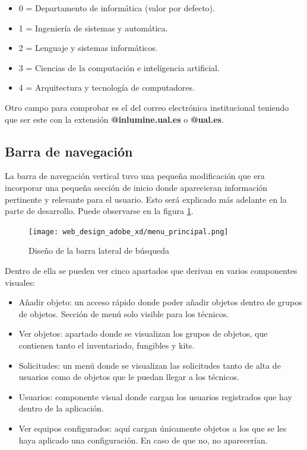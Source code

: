 \begin{itemize}
    \item 0 = Departamento de informática (valor por defecto).
    \item 1 = Ingeniería de sistemas y automática.
    \item 2 = Lenguaje y sistemas informáticos.
    \item 3 = Ciencias de la computación e inteligencia artificial.
    \item 4 = Arquitectura y tecnología de computadores.
\end{itemize}

Otro campo para comprobar es el del correo electrónica institucional teniendo que ser este con la extensión \textbf{@inlumine.ual.es} o \textbf{@ual.es}.

\subsection{Barra de navegación}

La barra de navegación vertical tuvo una pequeña modificación que era incorporar una pequeña sección de inicio donde aparecieran información pertinente y relevante para el usuario. Esto será explicado más adelante en la parte de desarrollo. Puede observarse en la figura \ref{barra_de_navegacion}.

\begin{figure}[h]
    \begin{center}
        \texttt{[image: web\_design\_adobe\_xd/menu\_principal.png]}
        \caption{Diseño de la barra lateral de búsqueda}\label{barra_de_navegacion}
    \end{center}
\end{figure}

Dentro de ella se pueden ver cinco apartados que derivan en varios componentes visuales:

\begin{itemize}
    \item Añadir objeto: un acceso rápido donde poder añadir objetos dentro de grupos de objetos. Sección de menú solo visible para los técnicos.
    \item Ver objetos: apartado donde se visualizan los grupos de objetos, que contienen tanto el inventariado, fungibles y kits.
    \item Solicitudes: un menú donde se visualizan las solicitudes tanto de alta de usuarios como de objetos que le puedan llegar a los técnicos.
    \item Usuarios: componente visual donde cargan los usuarios registrados que hay dentro de la aplicación.
    \item Ver equipos configurados: aquí cargan únicamente objetos a los que se les haya aplicado una configuración. En caso de que no, no aparecerían.
\end{itemize}

